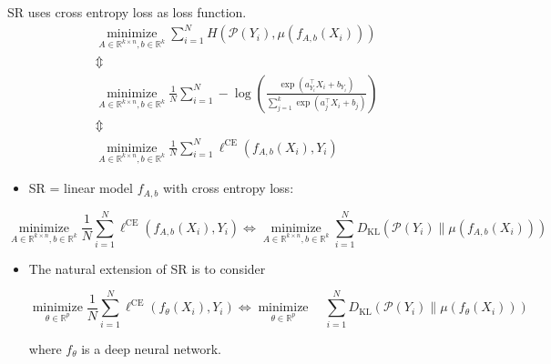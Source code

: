 \begin{frame}[allowframebreaks]

\begin{myconceptblock}{4.11}{SR uses cross entropy loss as loss function.}
    $$
    \begin{gathered}
    \underset{A \in \mathbb{R}^{k \times n}, b \in \mathbb{R}^{k}}{\operatorname{minimize}} \sum_{i=1}^{N} H\left(\mathcal{P}\left(Y_{i}\right), \mu\left(f_{A, b}\left(X_{i}\right)\right)\right) \\
    \mathbb{\Updownarrow} \\
    \underset{A \in \mathbb{R}^{k \times n}, b \in \mathbb{R}^{k}}{\operatorname{minimize}} \frac{1}{N} \sum_{i=1}^{N}-\log \left(\frac{\exp \left(a_{Y_{i}}^{\top} X_{i}+b_{Y_{i}}\right)}{\sum_{j=1}^{k} \exp \left(a_{j}^{\top} X_{i}+b_{j}\right)}\right) \\
    \mathbb{\Updownarrow} \\
    \underset{A \in \mathbb{R}^{k \times n}, b \in \mathbb{R}^{k}}{\operatorname{minimize}} \frac{1}{N} \sum_{i=1}^{N} \ell^{\mathrm{CE}}\left(f_{A, b}\left(X_{i}\right), Y_{i}\right)
    \end{gathered}
    $$

    \begin{itemize}
        \item SR = linear model $f_{A, b}$ with cross entropy loss:
    \end{itemize}

    $$
    \underset{A \in \mathbb{R}^{k \times n}, b \in \mathbb{R}^{k}}{\operatorname{minimize}} \frac{1}{N} \sum_{i=1}^{N} \ell^{\mathrm{CE}}\left(f_{A, b}\left(X_{i}\right), Y_{i}\right) \Longleftrightarrow \underset{A \in \mathbb{R}^{k \times n}, b \in \mathbb{R}^{k}}{\operatorname{minimize}} \sum_{i=1}^{N} D_{\mathrm{KL}}\left(\mathcal{P}\left(Y_{i}\right) \| \mu\left(f_{A, b}\left(X_{i}\right)\right)\right)
    $$

    \begin{itemize}
        \item
        The natural extension of SR is to consider

        $$
        \underset{\theta \in \mathbb{R}^{p}}{\operatorname{minimize}} \frac{1}{N} \sum_{i=1}^{N} \ell^{\mathrm{CE}}\left(f_{\theta}\left(X_{i}\right), Y_{i}\right) \Leftrightarrow \underset{\theta \in \mathbb{R}^{p}}{\operatorname{minimize}} \quad \sum_{i=1}^{N} D_{\mathrm{KL}}\left(\mathcal{P}\left(Y_{i}\right) \| \mu\left(f_{\theta}\left(X_{i}\right)\right)\right)
        $$

        where $f_{\theta}$ is a deep neural network.
    \end{itemize}
\end{myconceptblock}

\end{frame}

